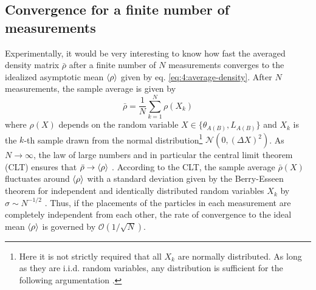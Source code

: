 \subsection*{Convergence for a finite number of measurements}
Experimentally, it would be very interesting to know how fast the averaged density matrix $\bar{\rho}$ after a finite number of $N$ measurements converges to the idealized asymptotic mean $\left\langle\rho\right\rangle$ given by eq. \eqref{eq:4:average-density}.
After $N$ measurements, the sample average is given by
\begin{equation}
  \bar{\rho} = \frac{1}{N} \sum_{k=1}^{N} \rho(X_k)
\end{equation}
where $\rho(X)$ depends on the random variable $X \in \{\theta_{A(B)}, L_{A(B)}\}$ and $X_k$ is the $k$-th sample drawn from the normal distribution\footnote{Here it is not strictly required that all $X_k$ are normally distributed. As long as they are i.i.d. random variables, any distribution is sufficient for the following argumentation \cite[p. 1195]{Riley_2018}.} $\mathcal{N}(0, (\Delta X)^2)$.
As $N \rightarrow \infty$, the law of large numbers and in particular the central limit theorem (CLT) ensures that $\bar{\rho} \rightarrow \left\langle\rho\right\rangle$ \cite[p. 1195]{Riley_2018}.
According to the CLT, the sample average $\bar{\rho}(X)$ fluctuates around $\left\langle\rho\right\rangle$ with a standard deviation given by the Berry-Esseen theorem for independent and identically distributed random variables $X_k$ by $\sigma \sim N^{-1/2}$ \cite{Berry_1941}.
Thus, if the placements of the particles in each measurement are completely independent from each other, the rate of convergence to the ideal mean $\left\langle\rho\right\rangle$ is governed by $\mathcal{O}(1/\sqrt{N})$.

